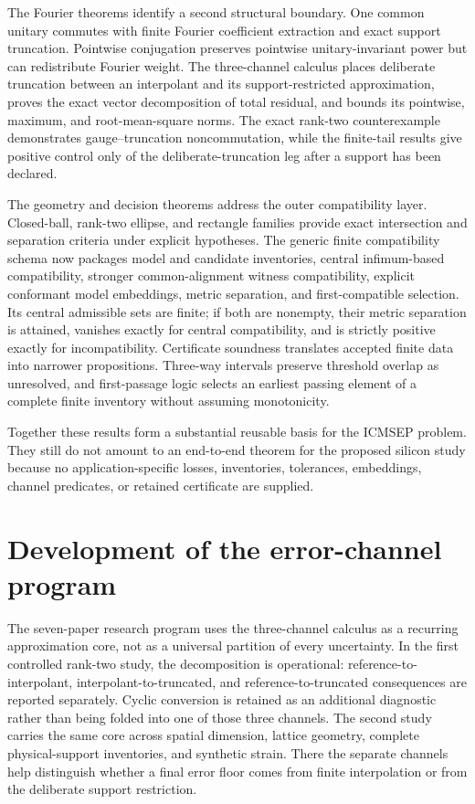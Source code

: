 The Fourier theorems identify a second structural boundary.  One common unitary
commutes with finite Fourier coefficient extraction and exact support truncation.
Pointwise conjugation preserves pointwise unitary-invariant power but can redistribute
Fourier weight.  The three-channel calculus places deliberate truncation between an
interpolant and its support-restricted approximation, proves the exact vector
decomposition of total residual, and bounds its pointwise, maximum, and root-mean-square
norms.  The exact rank-two counterexample demonstrates gauge--truncation
noncommutation, while the finite-tail results give positive control only of the
deliberate-truncation leg after a support has been declared.

The geometry and decision theorems address the outer compatibility layer.  Closed-ball,
rank-two ellipse, and rectangle families provide exact intersection and separation
criteria under explicit hypotheses.  The generic finite compatibility schema now
packages model and candidate inventories, central infimum-based compatibility, stronger
common-alignment witness compatibility, explicit conformant model embeddings, metric
separation, and first-compatible selection.  Its central admissible sets are finite; if
both are nonempty, their metric separation is attained, vanishes exactly for central
compatibility, and is strictly positive exactly for incompatibility.  Certificate
soundness translates accepted finite data into narrower propositions.  Three-way
intervals preserve threshold overlap as unresolved, and first-passage logic selects an
earliest passing element of a complete finite inventory without assuming monotonicity.

Together these results form a substantial reusable basis for the ICMSEP problem.  They
still do not amount to an end-to-end theorem for the proposed silicon study because no
application-specific losses, inventories, tolerances, embeddings, channel predicates, or
retained certificate are supplied.

\section{Development of the error-channel program}
\label{sec:seven-paper-error-channel-development}

The seven-paper research program uses the three-channel calculus as a recurring
approximation core, not as a universal partition of every uncertainty.  In the first
controlled rank-two study, the decomposition is operational: reference-to-interpolant,
interpolant-to-truncated, and reference-to-truncated consequences are reported
separately.  Cyclic conversion is retained as an additional diagnostic rather than
being folded into one of those three channels.  The second study carries the same core
across spatial dimension, lattice geometry, complete physical-support inventories, and
synthetic strain.  There the separate channels help distinguish whether a final error
floor comes from finite interpolation or from the deliberate support restriction.

